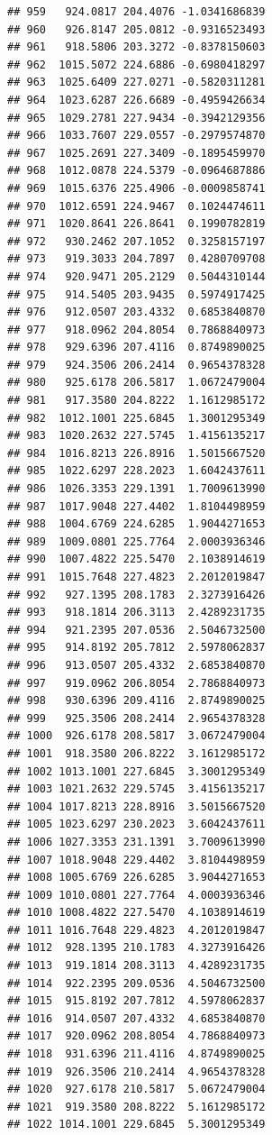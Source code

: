 \documentclass[
]{article}
\begin{document}
\begin{verbatim}
## 959   924.0817 204.4076 -1.0341686839
## 960   926.8147 205.0812 -0.9316523493
## 961   918.5806 203.3272 -0.8378150603
## 962  1015.5072 224.6886 -0.6980418297
## 963  1025.6409 227.0271 -0.5820311281
## 964  1023.6287 226.6689 -0.4959426634
## 965  1029.2781 227.9434 -0.3942129356
## 966  1033.7607 229.0557 -0.2979574870
## 967  1025.2691 227.3409 -0.1895459970
## 968  1012.0878 224.5379 -0.0964687886
## 969  1015.6376 225.4906 -0.0009858741
## 970  1012.6591 224.9467  0.1024474611
## 971  1020.8641 226.8641  0.1990782819
## 972   930.2462 207.1052  0.3258157197
## 973   919.3033 204.7897  0.4280709708
## 974   920.9471 205.2129  0.5044310144
## 975   914.5405 203.9435  0.5974917425
## 976   912.0507 203.4332  0.6853840870
## 977   918.0962 204.8054  0.7868840973
## 978   929.6396 207.4116  0.8749890025
## 979   924.3506 206.2414  0.9654378328
## 980   925.6178 206.5817  1.0672479004
## 981   917.3580 204.8222  1.1612985172
## 982  1012.1001 225.6845  1.3001295349
## 983  1020.2632 227.5745  1.4156135217
## 984  1016.8213 226.8916  1.5015667520
## 985  1022.6297 228.2023  1.6042437611
## 986  1026.3353 229.1391  1.7009613990
## 987  1017.9048 227.4402  1.8104498959
## 988  1004.6769 224.6285  1.9044271653
## 989  1009.0801 225.7764  2.0003936346
## 990  1007.4822 225.5470  2.1038914619
## 991  1015.7648 227.4823  2.2012019847
## 992   927.1395 208.1783  2.3273916426
## 993   918.1814 206.3113  2.4289231735
## 994   921.2395 207.0536  2.5046732500
## 995   914.8192 205.7812  2.5978062837
## 996   913.0507 205.4332  2.6853840870
## 997   919.0962 206.8054  2.7868840973
## 998   930.6396 209.4116  2.8749890025
## 999   925.3506 208.2414  2.9654378328
## 1000  926.6178 208.5817  3.0672479004
## 1001  918.3580 206.8222  3.1612985172
## 1002 1013.1001 227.6845  3.3001295349
## 1003 1021.2632 229.5745  3.4156135217
## 1004 1017.8213 228.8916  3.5015667520
## 1005 1023.6297 230.2023  3.6042437611
## 1006 1027.3353 231.1391  3.7009613990
## 1007 1018.9048 229.4402  3.8104498959
## 1008 1005.6769 226.6285  3.9044271653
## 1009 1010.0801 227.7764  4.0003936346
## 1010 1008.4822 227.5470  4.1038914619
## 1011 1016.7648 229.4823  4.2012019847
## 1012  928.1395 210.1783  4.3273916426
## 1013  919.1814 208.3113  4.4289231735
## 1014  922.2395 209.0536  4.5046732500
## 1015  915.8192 207.7812  4.5978062837
## 1016  914.0507 207.4332  4.6853840870
## 1017  920.0962 208.8054  4.7868840973
## 1018  931.6396 211.4116  4.8749890025
## 1019  926.3506 210.2414  4.9654378328
## 1020  927.6178 210.5817  5.0672479004
## 1021  919.3580 208.8222  5.1612985172
## 1022 1014.1001 229.6845  5.3001295349

\end{verbatim}
\end{document}

